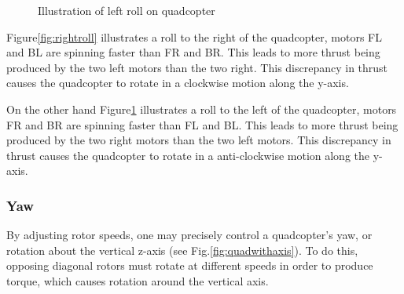 \documentclass{article}
\begin{document}
\begin{figure}[H]
\begin{minipage}{.5\textwidth}
    \caption{Illustration of left roll on quadcopter}
    \label{fig:leftroll}
  \end{minipage}
\end{figure}

Figure\ref{fig:rightroll} illustrates a roll to the right of the quadcopter, motors FL and BL are spinning faster than FR and BR. This leads to more thrust being produced by the two left motors than the two right. This discrepancy in thrust causes the quadcopter to rotate in a clockwise motion along the y-axis.

On the other hand Figure\ref{fig:leftroll} illustrates a roll to the left of the quadcopter, motors FR and BR are spinning faster than FL and BL. This leads to more thrust being produced by the two right motors than the two left motors. This discrepancy in thrust causes the quadcopter to rotate in a anti-clockwise motion along the y-axis.

\subsubsection{Yaw}
By adjusting rotor speeds, one may precisely control a quadcopter's yaw, or rotation about the vertical z-axis (see Fig.\ref{fig:quadwithaxis}). To do this, opposing diagonal rotors must rotate at different speeds in order to produce torque, which causes rotation around the vertical axis.
\end{document}
